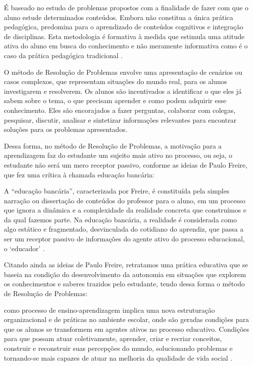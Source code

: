 \begin{citacao}
    É baseado no estudo de problemas propostos com a finalidade de fazer com que o aluno estude determinados conteúdos. Embora não constitua a única prática pedagógica, predomina para o aprendizado de conteúdos cognitivos e integração de disciplinas. Esta metodologia é formativa à medida que estimula uma atitude ativa do aluno em busca do conhecimento e não meramente informativa como é o caso da prática pedagógica tradicional \cite[p. 50]{TANGERINO2017}.
\end{citacao}

O método de Resolução de Problemas envolve uma apresentação de cenários ou casos complexos, que representam situações do mundo real, para os alunos investigarem e resolverem. Os alunos são incentivados a identificar o que eles já sabem sobre o tema, o que precisam aprender e como podem adquirir esse conhecimento. Eles são encorajados a fazer perguntas, colaborar com colegas, pesquisar, discutir, analisar e sintetizar informações relevantes para encontrar soluções para os problemas apresentados.

Dessa forma, no método de Resolução de Problemas, a motivação para a aprendizagem faz do estudante um sujeito mais ativo no processo, ou seja, o estudante não será um mero receptor passivo, conforme as ideias de Paulo Freire, que fez uma crítica à chamada educação bancária:

\begin{citacao}
    A ``educação bancária'', caracterizada por Freire, é constituída pela simples narração ou dissertação de conteúdos do professor para o aluno, em um processo que ignora a dinâmica e a complexidade da realidade concreta que construímos e da qual fazemos parte. Na educação bancária, a realidade é considerada como algo estático e fragmentado, desvinculada do cotidiano do aprendiz, que passa a ser um receptor passivo de informações do agente ativo do processo educacional, o `educador' \cite[p. 181]{PIERINI2019}.
\end{citacao}

Citando ainda as ideias de Paulo Freire, retratamos uma prática educativa que se baseia na condição do desenvolvimento da autonomia em situações que explorem os conhecimentos e saberes trazidos pelo estudante, tendo dessa forma o método de Resolução de Problemas:

\begin{citacao}[portuguese]
    [...] como processo de ensino-aprendizagem implica uma nova estruturação organizacional e de práticas no ambiente escolar, onde são geradas condições para que os alunos se transformem em agentes ativos no processo educativo. Condições para que possam atuar coletivamente, aprender, criar e recriar conceitos, construir e reconstruir suas percepções do mundo, solucionando problemas e tornando-se mais capazes de atuar na melhoria da qualidade de vida social \cite[p. 183]{PIERINI2019}.
\end{citacao}

